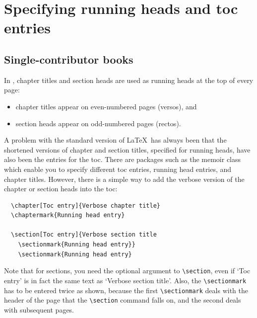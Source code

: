 \section{Specifying running heads and toc entries}

\subsection{Single-contributor books}
\label{singlecontributor}

In \cambridge, chapter titles and section heads are used as running heads at the top of every page:
\begin{itemize}
\item chapter titles appear on even-numbered pages (versos), and
\item section heads appear on odd-numbered pages (rectos).
\end{itemize}
A problem with the standard version of \LaTeX\ has always been that the shortened versions of chapter and section titles, specified for running heads, have also been the entries for the toc. There are packages such as the memoir class which enable you to specify different toc entries, running head entries, and chapter titles. However, there is a simple way to add the verbose version of the chapter or section heads into the toc:
\begin{verbatim}
  \chapter[Toc entry]{Verbose chapter title}
  \chaptermark{Running head entry}

  \section[Toc entry]{Verbose section title
    \sectionmark{Running head entry}}
    \sectionmark{Running head entry}
\end{verbatim}
Note that for sections, you need the optional argument to \verb"\section", even if `Toc entry' is in fact the same text as `Verbose section title'. Also, the \verb"\sectionmark" has to be entered twice as shown, because the first \verb"\sectionmark" deals with the header of the page that the \verb"\section" command falls on, and the second deals with subsequent pages.

